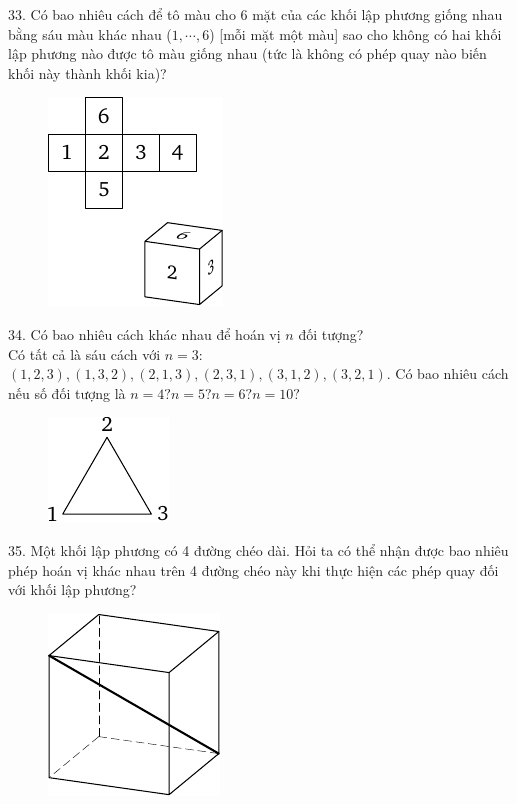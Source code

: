 \begin{problem}{33.}
	Có bao nhiêu cách  để tô màu cho 6 mặt của các  khối lập phương giống nhau  bằng sáu  màu khác nhau ($1,\cdots, 6$) [mỗi mặt một màu] sao cho  không có hai khối lập phương nào được tô màu giống nhau (tức là không có phép quay nào biến khối này thành khối kia)?
	\begin{figure}
		\includegraphics[scale=1]{taskbook-17}
	\end{figure}
\end{problem}

\begin{problem}{34.}
	Có bao nhiêu cách khác nhau để hoán vị $n$ đối tượng?\\
	Có tất cả là sáu cách với $n=3:$ $ (1,2,3), (1,3,2), (2,1,3), (2,3,1), (3,1,2), (3,2,1)$. Có bao nhiêu cách nếu số đối tượng là $ n = 4? n = 5? n = 6? n = 10?$
	\begin{figure}
		\includegraphics{taskbook-18}
	\end{figure}
\end{problem}

\begin{problem}{35.}
	Một khối lập phương có 4 đường chéo dài. Hỏi ta có thể nhận được bao nhiêu phép hoán vị khác nhau trên 4 đường chéo này khi thực hiện các phép quay đối với khối lập phương?
	\begin{figure}
		\includegraphics{taskbook-19}
	\end{figure}
\end{problem}


